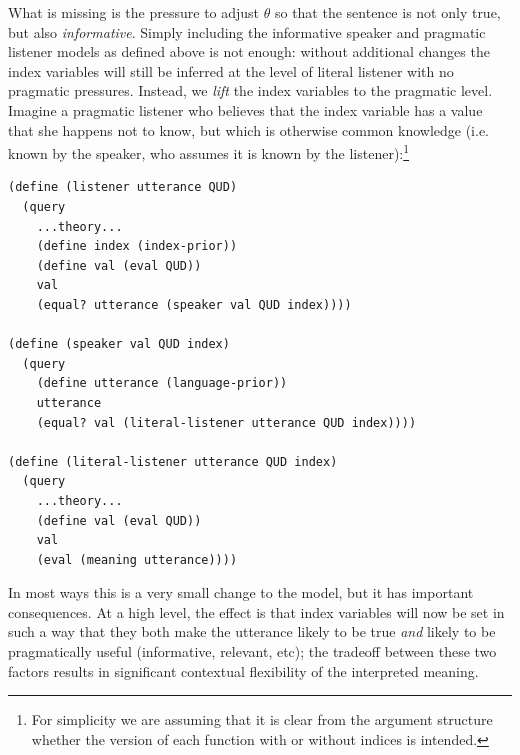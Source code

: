 \documentclass[pdfextras]{handbook}
\begin{document}
What is missing is the pressure to adjust $\theta$ so that the sentence is not only true, but also \emph{informative}. 
Simply including the informative speaker and pragmatic listener models as defined above is not enough: without additional changes the index variables will still be inferred at the level of literal listener with no pragmatic pressures. 
Instead, we \emph{lift} the index variables to the pragmatic level. 
Imagine a pragmatic listener who believes that the index variable has a value that she happens not to know, but which is otherwise common knowledge (i.e. known by the speaker, who assumes it is known by the listener):\footnote{For simplicity we are assuming that it is clear from the argument structure whether the version of each function with or without indices is intended.}
\begin{lstlisting}
(define (listener utterance QUD)
  (query
    ...theory...
    (define index (index-prior))
    (define val (eval QUD))
    val
    (equal? utterance (speaker val QUD index))))
    
(define (speaker val QUD index)
  (query
    (define utterance (language-prior))
    utterance
    (equal? val (literal-listener utterance QUD index))))

(define (literal-listener utterance QUD index)
  (query
    ...theory...
    (define val (eval QUD))
    val
    (eval (meaning utterance))))
\end{lstlisting}
In most ways this is a very small change to the model, but it has important consequences. 
At a high level, the effect is that index variables will now be set in such a way that they both make the utterance likely to be true \emph{and} likely to be pragmatically useful (informative, relevant, etc); the tradeoff between these two factors results in significant contextual flexibility of the interpreted meaning. 
\end{document}
